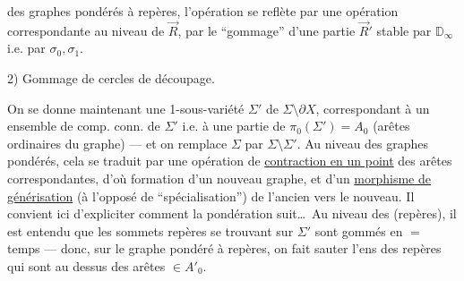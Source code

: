 
des graphes pondérés à repères, l'opération 
se reflète par une opération correspondante au niveau de $\vec R$, par le ``gommage'' d'une partie $\vec R'$ stable par $\mathbb D_\infty$ i.e. par $\sigma_0,\sigma_1$.

2) Gommage de cercles de découpage.

On se donne maintenant une  1-sous-variété
  $\Sigma'$ de $\Sigma\setminus\partial X$,
correspondant à un ensemble  de comp. conn. de $\Sigma'$ i.e. à une partie  de $\pi_0(\Sigma')=A_0$
(arêtes ordinaires du graphe) --- et on remplace $\Sigma$ par $\Sigma\setminus\Sigma'$.
Au niveau des graphes pondérés, cela se traduit par une opération de \uline{contraction en un point} des arêtes correspondantes, d'où formation d'un nouveau graphe, et d'un \uline{morphisme de générisation} (à l'opposé de ``spécialisation'') de l'ancien vers le nouveau.
Il convient ici d'expliciter comment la pondération suit\ldots\
Au niveau des  (repères), il est entendu que les sommets repères se trouvant sur $\Sigma'$ sont gommés en $=$ temps --- donc, sur le graphe pondéré à repères, on fait sauter l'ens des repères qui sont au dessus des arêtes $\in A'_0$.
\mspage{53}
